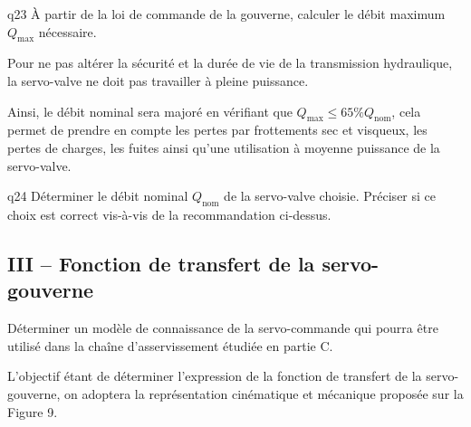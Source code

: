 \begin{multicols}{2}
{\begin{question}{q23}
À partir de la loi de commande de la gouverne, calculer le débit maximum $Q_{\text{max}}$ nécessaire.
\ifprof
\begin{corrige}
\end{corrige}
\else
\fi
\begin{reponses}
\end{reponses} \end{question}}  

Pour ne pas altérer la sécurité et la durée de vie de la transmission hydraulique, la servo-valve ne doit pas travailler à pleine puissance.

Ainsi, le débit nominal sera majoré en vérifiant que $Q_{\text{max}}\leq 65\% Q_{\text{nom}}$, cela permet de prendre en compte les pertes par frottements sec et visqueux, les pertes de charges, les fuites ainsi qu’une utilisation à moyenne puissance de la servo-valve.


{\begin{question}{q24}
Déterminer le débit nominal $Q_{\text{nom}}$ de la servo-valve choisie. Préciser si ce choix est correct vis-à-vis de la recommandation ci-dessus.
\ifprof
\begin{corrige}
\end{corrige}
\else
\fi
\begin{reponses}
\end{reponses} \end{question}}  

\subsection*{III -- Fonction de transfert de la servo-gouverne}
\begin{obj}
Déterminer un modèle de connaissance de la servo-commande qui pourra être utilisé dans la
chaîne d’asservissement étudiée en partie C.
\end{obj}

L’objectif étant de déterminer l’expression de la fonction de transfert de la servo-gouverne, on adoptera la représentation cinématique et mécanique proposée sur la Figure 9.


\end{multicols}
